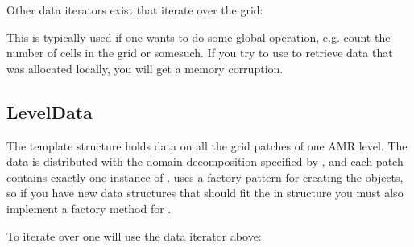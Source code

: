 \documentclass[letterpaper,10pt,english]{sphinxmanual}
\begin{document}
Other data iterators exist that iterate over the  grid:

\begin{sphinxVerbatim}[commandchars=\\\{\},formatcom=\scriptsize]
      
\end{sphinxVerbatim}

This is typically used if one wants to do some global operation, e.g. count the number of cells in the grid or somesuch.
If you try to use  to retrieve data that was allocated locally, you will get a memory corruption.


\subsection{LevelData}
\label{\detokenize{Basics:leveldata}}
The  template structure holds data on all the grid patches of one AMR level.
The data is distributed with the domain decomposition specified by , and each patch contains exactly one instance of .
 uses a factory pattern for creating the  objects, so if you have new data structures that should fit the in  structure you must also implement a factory method for .

To iterate over  one will use the data iterator above:

\begin{sphinxVerbatim}[commandchars=\\\{\},formatcom=\scriptsize]
 
      
       
     \PYG{p}{[}\PYG{p}{]}
\end{sphinxVerbatim}
\end{document}
